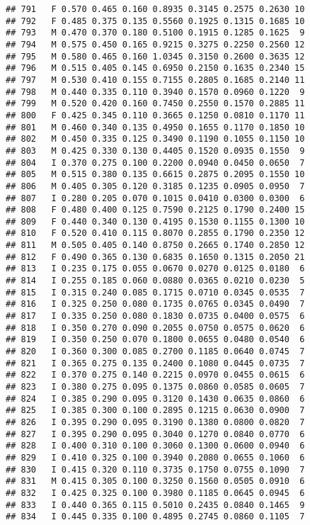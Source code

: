 \documentclass[
]{article}
\begin{document}
\begin{verbatim}
## 791   F 0.570 0.465 0.160 0.8935 0.3145 0.2575 0.2630 10
## 792   F 0.485 0.375 0.135 0.5560 0.1925 0.1315 0.1685 10
## 793   M 0.470 0.370 0.180 0.5100 0.1915 0.1285 0.1625  9
## 794   M 0.575 0.450 0.165 0.9215 0.3275 0.2250 0.2560 12
## 795   M 0.580 0.465 0.160 1.0345 0.3150 0.2600 0.3635 12
## 796   M 0.515 0.405 0.145 0.6950 0.2150 0.1635 0.2340 15
## 797   M 0.530 0.410 0.155 0.7155 0.2805 0.1685 0.2140 11
## 798   M 0.440 0.335 0.110 0.3940 0.1570 0.0960 0.1220  9
## 799   M 0.520 0.420 0.160 0.7450 0.2550 0.1570 0.2885 11
## 800   F 0.425 0.345 0.110 0.3665 0.1250 0.0810 0.1170 11
## 801   M 0.460 0.340 0.135 0.4950 0.1655 0.1170 0.1850 10
## 802   M 0.450 0.335 0.125 0.3490 0.1190 0.1055 0.1150 10
## 803   M 0.425 0.330 0.130 0.4405 0.1520 0.0935 0.1550  9
## 804   I 0.370 0.275 0.100 0.2200 0.0940 0.0450 0.0650  7
## 805   M 0.515 0.380 0.135 0.6615 0.2875 0.2095 0.1550 10
## 806   M 0.405 0.305 0.120 0.3185 0.1235 0.0905 0.0950  7
## 807   I 0.280 0.205 0.070 0.1015 0.0410 0.0300 0.0300  6
## 808   F 0.480 0.400 0.125 0.7590 0.2125 0.1790 0.2400 15
## 809   F 0.440 0.340 0.130 0.4195 0.1530 0.1155 0.1300 10
## 810   F 0.520 0.410 0.115 0.8070 0.2855 0.1790 0.2350 12
## 811   M 0.505 0.405 0.140 0.8750 0.2665 0.1740 0.2850 12
## 812   F 0.490 0.365 0.130 0.6835 0.1650 0.1315 0.2050 21
## 813   I 0.235 0.175 0.055 0.0670 0.0270 0.0125 0.0180  6
## 814   I 0.255 0.185 0.060 0.0880 0.0365 0.0210 0.0230  5
## 815   I 0.315 0.240 0.085 0.1715 0.0710 0.0345 0.0535  7
## 816   I 0.325 0.250 0.080 0.1735 0.0765 0.0345 0.0490  7
## 817   I 0.335 0.250 0.080 0.1830 0.0735 0.0400 0.0575  6
## 818   I 0.350 0.270 0.090 0.2055 0.0750 0.0575 0.0620  6
## 819   I 0.350 0.250 0.070 0.1800 0.0655 0.0480 0.0540  6
## 820   I 0.360 0.300 0.085 0.2700 0.1185 0.0640 0.0745  7
## 821   I 0.365 0.275 0.135 0.2400 0.1080 0.0445 0.0735  7
## 822   I 0.370 0.275 0.140 0.2215 0.0970 0.0455 0.0615  6
## 823   I 0.380 0.275 0.095 0.1375 0.0860 0.0585 0.0605  7
## 824   I 0.385 0.290 0.095 0.3120 0.1430 0.0635 0.0860  6
## 825   I 0.385 0.300 0.100 0.2895 0.1215 0.0630 0.0900  7
## 826   I 0.395 0.290 0.095 0.3190 0.1380 0.0800 0.0820  7
## 827   I 0.395 0.290 0.095 0.3040 0.1270 0.0840 0.0770  6
## 828   I 0.400 0.310 0.100 0.3060 0.1300 0.0600 0.0940  6
## 829   I 0.410 0.325 0.100 0.3940 0.2080 0.0655 0.1060  6
## 830   I 0.415 0.320 0.110 0.3735 0.1750 0.0755 0.1090  7
## 831   M 0.415 0.305 0.100 0.3250 0.1560 0.0505 0.0910  6
## 832   I 0.425 0.325 0.100 0.3980 0.1185 0.0645 0.0945  6
## 833   I 0.440 0.365 0.115 0.5010 0.2435 0.0840 0.1465  9
## 834   I 0.445 0.335 0.100 0.4895 0.2745 0.0860 0.1105  7

\end{verbatim}
\end{document}
